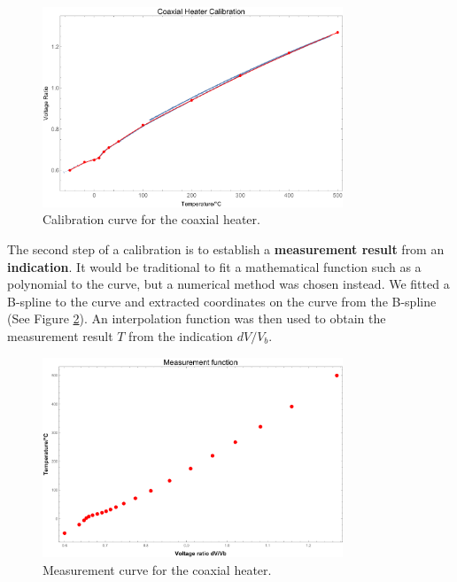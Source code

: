 \begin{figure}
	\centering
	\includegraphics[width=0.8\textwidth]{Figures/2019_07_12_B-spline_fit_CPlot.pdf}
	\decoRule
	\caption[Calibration curve of the coaxial heater]{Calibration curve for the coaxial heater.}	
	\label{fig:CalibrationCurve}
\end{figure}

The second step of a calibration is to establish a \textbf{measurement result}
from an \textbf{indication}. It would be traditional to fit a mathematical
function such as a polynomial to the curve, but a numerical method was chosen
instead. We fitted a B-spline to the curve and extracted coordinates on the
curve from the B-spline (See Figure \ref{fig:MeasurementCurve}). An
interpolation function was then used to obtain the measurement result \(T\) from
the indication \(dV/V_b\).

\begin{figure}
	\centering
	\includegraphics[width=0.8\textwidth]{Figures/2019_07_12_B-spline_fit_PPlot.pdf}
	\decoRule
	\caption[Measurement curve of the coaxial heater]{Measurement curve for the coaxial heater.}	
	\label{fig:MeasurementCurve}
\end{figure}

